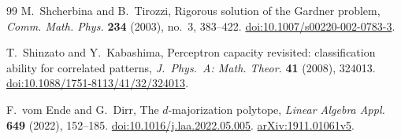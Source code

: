 \documentclass[11pt]{article}
\numberwithin{equation}{section}
\theoremstyle{definition}
\begin{document}
\begin{thebibliography}{99}
M.~Shcherbina and B.~Tirozzi, Rigorous solution of the Gardner problem,
\emph{Comm. Math. Phys.} \textbf{234} (2003), no.~3, 383--422.
\href{https://doi.org/10.1007/s00220-002-0783-3}{doi:10.1007/s00220-002-0783-3}.

T.~Shinzato and Y.~Kabashima, Perceptron capacity revisited: classification ability for correlated patterns,
\emph{J.~Phys.~A: Math. Theor.} \textbf{41} (2008), 324013.
\href{https://doi.org/10.1088/1751-8113/41/32/324013}{doi:10.1088/1751-8113/41/32/324013}.

F.~vom Ende and G.~Dirr, The $d$-majorization polytope,
\emph{Linear Algebra Appl.} \textbf{649} (2022), 152--185.
\href{https://doi.org/10.1016/j.laa.2022.05.005}{doi:10.1016/j.laa.2022.05.005}.
\href{https://arxiv.org/abs/1911.01061v5}{arXiv:1911.01061v5}.

\end{thebibliography}
\end{document}
